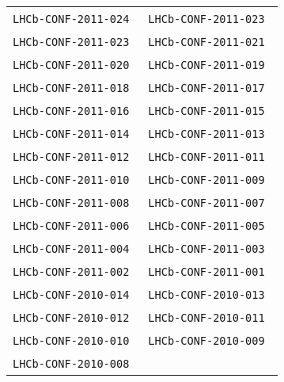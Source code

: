 \begin{center}
\begin{longtable}{ll}
\texttt{LHCb-CONF-2011-024}~\cite{LHCb-CONF-2011-024} &
\texttt{LHCb-CONF-2011-023}~\cite{LHCb-CONF-2011-023} \\
\texttt{LHCb-CONF-2011-023}~\cite{LHCb-CONF-2011-022} &
\texttt{LHCb-CONF-2011-021}~\cite{LHCb-CONF-2011-021} \\
\texttt{LHCb-CONF-2011-020}~\cite{LHCb-CONF-2011-020} &
\texttt{LHCb-CONF-2011-019}~\cite{LHCb-CONF-2011-019} \\
\texttt{LHCb-CONF-2011-018}~\cite{LHCb-CONF-2011-018} &
\texttt{LHCb-CONF-2011-017}~\cite{LHCb-CONF-2011-017} \\
\texttt{LHCb-CONF-2011-016}~\cite{LHCb-CONF-2011-016} &
\texttt{LHCb-CONF-2011-015}~\cite{LHCb-CONF-2011-015} \\
\texttt{LHCb-CONF-2011-014}~\cite{LHCb-CONF-2011-014} &
\texttt{LHCb-CONF-2011-013}~\cite{LHCb-CONF-2011-013} \\
\texttt{LHCb-CONF-2011-012}~\cite{LHCb-CONF-2011-012} &
\texttt{LHCb-CONF-2011-011}~\cite{LHCb-CONF-2011-011} \\
\texttt{LHCb-CONF-2011-010}~\cite{LHCb-CONF-2011-010} &
\texttt{LHCb-CONF-2011-009}~\cite{LHCb-CONF-2011-009} \\
\texttt{LHCb-CONF-2011-008}~\cite{LHCb-CONF-2011-008} &
\texttt{LHCb-CONF-2011-007}~\cite{LHCb-CONF-2011-007} \\
\texttt{LHCb-CONF-2011-006}~\cite{LHCb-CONF-2011-006} &
\texttt{LHCb-CONF-2011-005}~\cite{LHCb-CONF-2011-005} \\
\texttt{LHCb-CONF-2011-004}~\cite{LHCb-CONF-2011-004} &
\texttt{LHCb-CONF-2011-003}~\cite{LHCb-CONF-2011-003} \\
\texttt{LHCb-CONF-2011-002}~\cite{LHCb-CONF-2011-002} &
\texttt{LHCb-CONF-2011-001}~\cite{LHCb-CONF-2011-001} \\
\hline
\texttt{LHCb-CONF-2010-014}~\cite{LHCb-CONF-2010-014} &
\texttt{LHCb-CONF-2010-013}~\cite{LHCb-CONF-2010-013} \\
\texttt{LHCb-CONF-2010-012}~\cite{LHCb-CONF-2010-012} &
\texttt{LHCb-CONF-2010-011}~\cite{LHCb-CONF-2010-011} \\
\texttt{LHCb-CONF-2010-010}~\cite{LHCb-CONF-2010-010} &
\texttt{LHCb-CONF-2010-009}~\cite{LHCb-CONF-2010-009} \\
\texttt{LHCb-CONF-2010-008}~\cite{LHCb-CONF-2010-008} & \\
\hline
\end{longtable}
\end{center}

